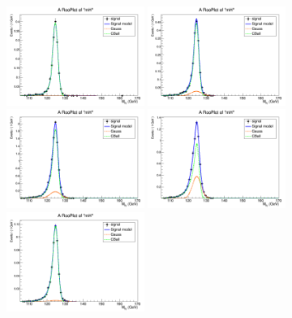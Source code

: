 \begin{figure}[htb]
	\begin{center}
		\includegraphics[width=0.40\textwidth]{fig/signal_fit/2017/sigfit_ele_ggF_1_125.png}
		\includegraphics[width=0.40\textwidth]{fig/signal_fit/2017/sigfit_ele_ggF_2_125.png}\\
		\includegraphics[width=0.40\textwidth]{fig/signal_fit/2017/sigfit_ele_ggF_3_125.png}
		\includegraphics[width=0.40\textwidth]{fig/signal_fit/2017/sigfit_ele_ggF_4_125.png}\\
		\includegraphics[width=0.40\textwidth]{fig/signal_fit/2017/sigfit_ele_VBF_501_125.png}

\end{center}
\end{figure}
